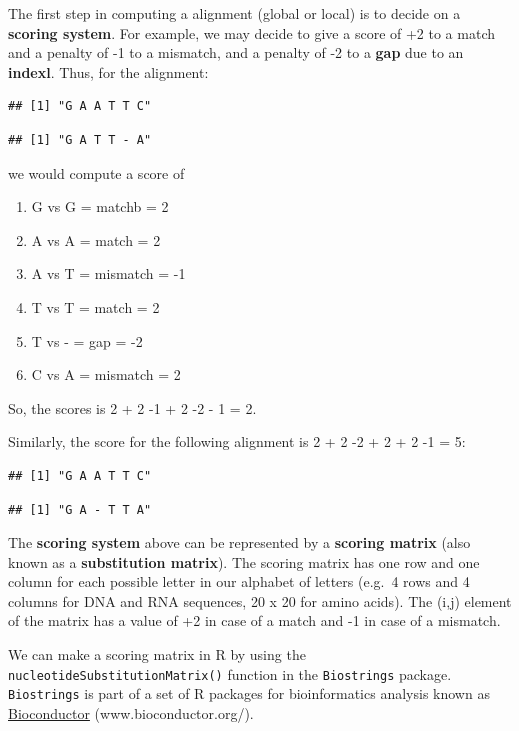 \documentclass[
]{book}
\providecommand{\tightlist}{%
  \setlength{\itemsep}{0pt}\setlength{\parskip}{0pt}}
\begin{document}
The first step in computing a alignment (global or local) is to decide on a \textbf{scoring system}. For example, we may decide to give a score of +2 to a match and a penalty of -1 to a mismatch, and a penalty of -2 to a \textbf{gap} due to an \textbf{indexl}. Thus, for the alignment:

\begin{verbatim}
## [1] "G A A T T C"
\end{verbatim}

\begin{verbatim}
## [1] "G A T T - A"
\end{verbatim}

we would compute a score of

\begin{enumerate}
\def\labelenumi{\arabic{enumi}.}
\tightlist
\item
  G vs G = matchb = 2
\item
  A vs A = match = 2
\item
  A vs T = mismatch = -1
\item
  T vs T = match = 2
\item
  T vs - = gap = -2
\item
  C vs A = mismatch = 2
\end{enumerate}

So, the scores is 2 + 2 -1 + 2 -2 - 1 = 2.

Similarly, the score for the following alignment is 2 + 2 -2 + 2 + 2 -1 = 5:

\begin{verbatim}
## [1] "G A A T T C"
\end{verbatim}

\begin{verbatim}
## [1] "G A - T T A"
\end{verbatim}

The \textbf{scoring system} above can be represented by a \textbf{scoring matrix} (also known as a \textbf{substitution matrix}). The scoring matrix has one row and one column for each possible letter in our alphabet of letters (e.g.~4 rows and 4 columns for DNA and RNA sequences, 20 x 20 for amino acids). The (i,j) element of the matrix has a value of +2 in case of a match and -1 in case of a mismatch.

We can make a scoring matrix in R by using the \texttt{nucleotideSubstitutionMatrix()} function in the \texttt{Biostrings} package. \texttt{Biostrings} is part of a set of R packages for bioinformatics analysis known as \href{www.bioconductor.org/}{Bioconductor} (www.bioconductor.org/).
\end{document}
